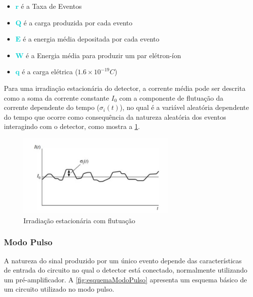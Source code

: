 \documentclass[11pt,a4paper]{article}
\newcounter{exemplo}
\begin{document}
			\begin{exemplo}[onde:]
				\begin{itemize}
					\item \textcolor{DarkTurquoise}{$\mathbf{r}$} é a Taxa de Eventos
					\item \textcolor{DarkTurquoise}{$\mathbf{Q}$} é a carga produzida por cada evento
					\item \textcolor{DarkTurquoise}{$\mathbf{E}$} é a energia média depositada por cada evento
					\item \textcolor{DarkTurquoise}{$\mathbf{W}$} é a Energia média para produzir um par elétron-íon
					\item \textcolor{DarkTurquoise}{$\mathbf{q}$} é a carga elétrica ($1.6 \times 10^{-19}C$)
				\end{itemize}
			\end{exemplo}


			Para uma irradiação estacionária do detector, a corrente média pode ser descrita como a soma da corrente constante $I_0$ com a componente de flutuação da corrente dependente do tempo ($\sigma_i(t)$), no qual é a variável aleatória dependente do tempo que ocorre como consequência da natureza aleatória dos eventos interagindo com o detector,  como mostra a  \ref{fig:esquemaCorrenteFlutuacao}.

			\begin{figure}[h]
				\centering
				\includegraphics[width=0.7\textwidth]{Imagens/esquemaCorrenteFlutuação.jpg}
				\caption{Irradiação estacionária com flutuação}
				\label{fig:esquemaCorrenteFlutuacao}
			\end{figure}

		\subsubsection*{Modo Pulso}

			A natureza do sinal produzido por um único evento depende das características de entrada do circuito no qual o detector está conectado, normalmente utilizando um pré-amplificador. A  \ref{fig:esquemaModoPulso} apresenta um esquema básico de um circuito utilizado no modo pulso. 
\end{document}
